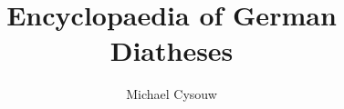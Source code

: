 \author{Michael Cysouw}
\title{Encyclopaedia of German Diatheses}

\renewcommand{\lsSeries}{ogl}



